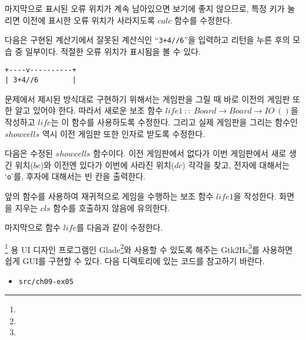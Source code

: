 마지막으로 표시된 오류 위치가 계속 남아있으면 보기에 좋지 않으므로, 특정 키가
눌리면 이전에 표시한 오류 위치가 사라지도록 $calc$ 함수를 수정한다.


다음은 구현된 계산기에서 잘못된 계산식인 ``\texttt{3+4//6}''을 입력하고 리턴을
누른 후의 모습 중 일부이다. 적절한 오류 위치가 표시됨을 볼 수 있다.

\begin{lstlisting}
+----v----------+
| 3+4//6        |
\end{lstlisting}


문제에서 제시된 방식대로 구현하기 위해서는 게임판을 그릴 때 바로 이전의
게임판 또한 알고 있어야 한다. 따라서 새로운 보조 함수 $life1~::~Board
\rightarrow Board \rightarrow IO~()$을 작성하고 $life$는 이 함수를 사용하도록
수정한다. 그리고 실제 게임판을 그리는 함수인 $showcells$ 역시 이전 게임판 또한
인자로 받도록 수정한다.

다음은 수정된 $showcells$ 함수이다. 이전 게임판에서 없다가 이번 게임판에서
새로 생긴 위치($bc$)와 이전엔 있다가 이번에 사라진 위치($dc$) 각각을 찾고,
전자에 대해서는 `\texttt{o}'를, 후자에 대해서는 빈 칸을 출력한다.


앞의 함수를 사용하여 재귀적으로 게임을 수행하는 보조 함수 $life1$을
작성한다. 화면을 지우는 $cls$ 함수를 호출하지 않음에 유의한다.


마지막으로 함수 $life$를 다음과 같이 수정한다.




\GTK\footnote{} 용 UI 디자인 프로그램인
\textsf{Glade}\footnote{}와  
사용할 수 있도록 해주는
\textsf{Gtk2Hs}\footnote{}를 사용하면
쉽게 GUI를 구현할 수 있다. 다음 디렉토리에 있는 코드를 참고하기 바란다.

\begin{itemize}
\item \texttt{src/ch09-ex05}
\end{itemize}


